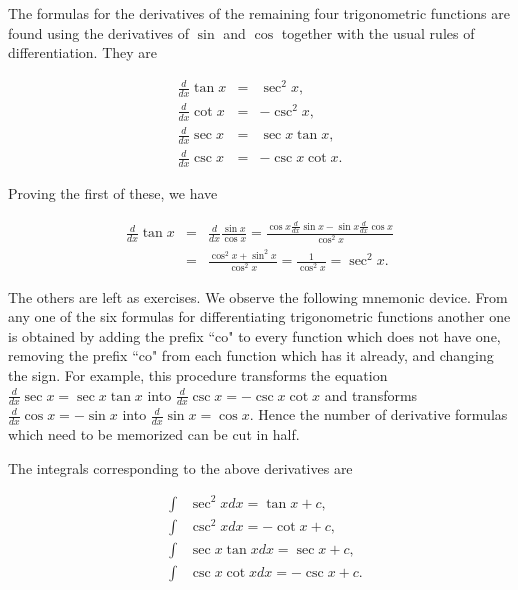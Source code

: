 The formulas for the derivatives of the remaining four trigonometric functions are found using
the derivatives of $\sin$ and $\cos$ together with the usual rules of differentiation. They are

 
\begin{theorem} %
\begin{eqnarray*}
\frac{d}{dx} \tan x &=& \sec^{2}x,\\
\frac{d}{dx} \cot x &=& - \csc^{2}x,\\
\frac{d}{dx} \sec x &=& \sec x \tan x, \\
\frac{d}{dx} \csc x &=&  - \csc x \cot x.
\end{eqnarray*}
\end{theorem}

Proving the first of these, we have

\begin{eqnarray*}
\frac{d}{dx} \tan x &=& \frac{d}{dx} \frac{\sin x}{\cos x} = \frac{\cos x \frac{d}{dx} \sin x - \sin x \frac{d}{dx} \cos x}{\cos^{2} x}   \\
&=& \frac{\cos^{2} x + \sin^{2} x}{\cos ^{2} x} = \frac{1}{\cos^{2} x} = \sec^{2} x.
\end{eqnarray*}

\noindent The others are left as exercises. We observe the following mnemonic device. 
From any one of the six formulas for differentiating trigonometric functions another one is obtained by adding the prefix ``co" to every function which does not have one, removing the prefix ``co" from each function which has it already, and changing the sign. For example, this procedure transforms the equation $\frac{d}{dx} \sec x = \sec x \tan x$ into $\frac{d}{dx} \csc x= -\csc x \cot x$ and transforms
$\frac{d}{dx} \cos x = - \sin x$ into $\frac{d}{dx} \sin x= \cos x$. Hence the number of derivative formulas which need to be memorized can be cut in half.

The integrals corresponding to the above derivatives are

\begin{theorem} %
\begin{eqnarray*}
&\int&\sec^{2}x dx = \tan x + c,\\
&\int&\csc^{2}x dx = -\cot x + c,\\
&\int&\sec x \tan x dx = \sec x + c,\\ 
&\int&\csc x\cot x dx = - \csc x + c.
\end{eqnarray*}
\end{theorem}

